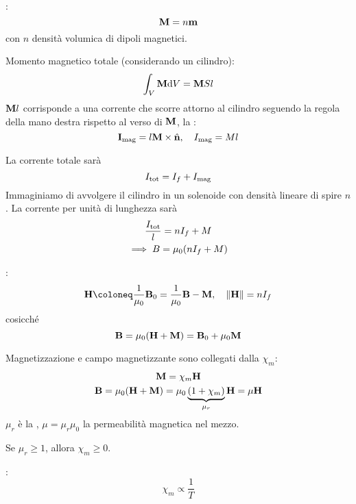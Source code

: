 :
\begin{equation}
    \mathbf{M} = n\mathbf{m}
\end{equation}
con $n$ densità volumica di dipoli magnetici.

Momento magnetico totale (considerando un cilindro):
\begin{equation}
    \int_V \mathbf{M} \mathrm{d} V = \mathbf{M} S l
\end{equation}
$\mathbf{M} l$ corrisponde a una corrente che scorre attorno al cilindro seguendo la regola della mano destra rispetto al verso di $\mathbf{M}$, la :
\begin{equation}
    \mathbf{I}_\text{mag} = l\mathbf{M} \times \hat{\mathbf{n}}, \quad
    I_\text{mag} = M l
\end{equation}

La corrente totale sarà
\begin{equation}
    I_\text{tot} = I_f + I_\text{mag}
\end{equation}
Immaginiamo di avvolgere il cilindro in un solenoide con densità lineare di spire $n$.
La corrente per unità di lunghezza sarà
\begin{gather}
    \frac{I_\text{tot}}{l} = n I_f + M \\
    \implies B = \mu_0(nI_f + M)
\end{gather}

:
\begin{equation}
    \H \coloneq \frac{1}{\mu_0} \B_0 = \frac{1}{\mu_0} \B - \vt{M}, \quad \norm{\H} = n I\free
\end{equation}
cosicché
\begin{equation}
    \mathbf{B} = \mu_0 (\mathbf{H} + \mathbf{M}) = \mathbf{B}_0 + \mu_0\mathbf{M}
\end{equation}

Magnetizzazione e campo magnetizzante sono collegati dalla  $\chi_m$:
\begin{gather}
    \mathbf{M} = \chi_m \mathbf{H} \\
    \mathbf{B} = \mu_0 (\mathbf{H} + \mathbf{M}) = \mu_0 \underbrace{(1 + \chi_m)}_{\mu_r} \mathbf{H} = \mu \mathbf{H}
\end{gather}
$\mu_r$ è la , $\mu = \mu_r \mu_0$ la permeabilità magnetica nel mezzo.

Se $\mu_r \ge 1$, allora $\chi_m \ge 0$.

:
\begin{equation}
    \chi_m \propto \frac{1}{T}
\end{equation}

